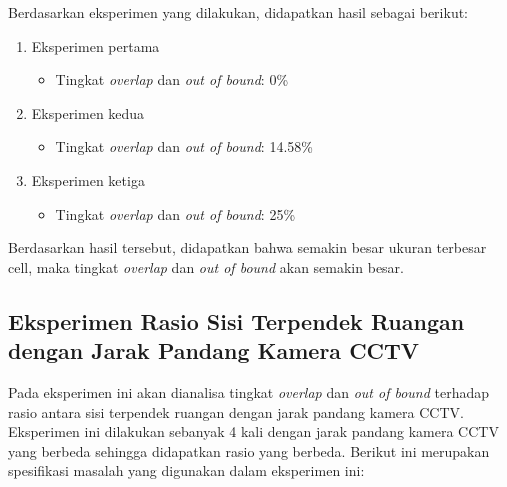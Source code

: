 Berdasarkan eksperimen yang dilakukan, didapatkan hasil sebagai berikut:
\begin{enumerate}
	\item Eksperimen pertama
	\begin{itemize}
		\item Tingkat \textit{overlap} dan \textit{out of bound}: 0\%
	\end{itemize}
	
	\item Eksperimen kedua
	\begin{itemize}
		\item Tingkat \textit{overlap} dan \textit{out of bound}: 14.58\%
	\end{itemize}
	
	\item Eksperimen ketiga
	\begin{itemize}
		\item Tingkat \textit{overlap} dan \textit{out of bound}: 25\%
	\end{itemize}
\end{enumerate}
	
Berdasarkan hasil tersebut, didapatkan bahwa semakin besar ukuran terbesar cell, maka tingkat \textit{overlap} dan \textit{out of bound} akan semakin besar.

\subsection{Eksperimen Rasio Sisi Terpendek Ruangan dengan Jarak Pandang Kamera CCTV}
Pada eksperimen ini akan dianalisa tingkat \textit{overlap} dan \textit{out of bound} terhadap rasio antara sisi terpendek ruangan dengan jarak pandang kamera CCTV. Eksperimen ini dilakukan sebanyak 4 kali dengan jarak pandang kamera CCTV yang berbeda sehingga didapatkan rasio yang berbeda. Berikut ini merupakan spesifikasi masalah yang digunakan dalam eksperimen ini:

